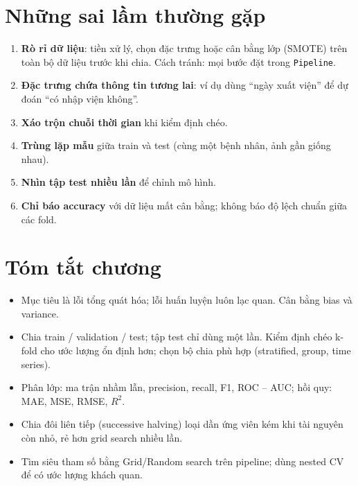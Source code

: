 \section{Những sai lầm thường gặp}
\begin{enumerate}
    \item \textbf{Rò rỉ dữ liệu}: tiền xử lý, chọn đặc trưng hoặc cân bằng lớp (SMOTE) trên toàn bộ dữ liệu trước khi chia. Cách tránh: mọi bước đặt trong \texttt{Pipeline}.
    \item \textbf{Đặc trưng chứa thông tin tương lai}: ví dụ dùng ``ngày xuất viện'' để dự đoán ``có nhập viện không''.
    \item \textbf{Xáo trộn chuỗi thời gian} khi kiểm định chéo.
    \item \textbf{Trùng lặp mẫu} giữa train và test (cùng một bệnh nhân, ảnh gần giống nhau).
    \item \textbf{Nhìn tập test nhiều lần} để chỉnh mô hình.
    \item \textbf{Chỉ báo accuracy} với dữ liệu mất cân bằng; không báo độ lệch chuẩn giữa các fold.
\end{enumerate}

\section{Tóm tắt chương}
\begin{itemize}
    \item Mục tiêu là lỗi tổng quát hóa; lỗi huấn luyện luôn lạc quan. Cân bằng bias và variance.
    \item Chia train / validation / test; tập test chỉ dùng một lần. Kiểm định chéo k-fold cho ước lượng ổn định hơn; chọn bộ chia phù hợp (stratified, group, time series).
    \item Phân lớp: ma trận nhầm lẫn, precision, recall, F1, ROC -- AUC; hồi quy: MAE, MSE, RMSE, $R^2$.
    \item Chia đôi liên tiếp (successive halving) loại dần ứng viên kém khi tài nguyên còn nhỏ, rẻ hơn grid search nhiều lần.
    \item Tìm siêu tham số bằng Grid/Random search trên pipeline; dùng nested CV để có ước lượng khách quan.
\end{itemize}

